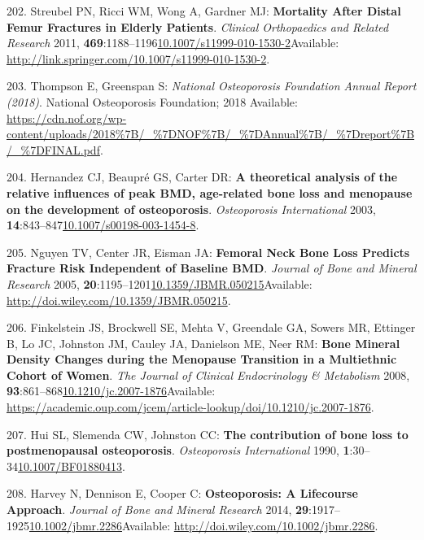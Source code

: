 \documentclass[
]{book}
\begin{document}
\leavevmode\hypertarget{ref-Streubel2011}{}%
202. Streubel PN, Ricci WM, Wong A, Gardner MJ: \textbf{Mortality After Distal Femur Fractures in Elderly Patients}. \emph{Clinical Orthopaedics and Related Research} 2011, \textbf{469}:1188--1196\href{https://doi.org/10.1007/s11999-010-1530-2}{10.1007/s11999-010-1530-2}Available: \url{http://link.springer.com/10.1007/s11999-010-1530-2}.

\leavevmode\hypertarget{ref-Thompson2018}{}%
203. Thompson E, Greenspan S: \emph{National Osteoporosis Foundation Annual Report (2018)}. National Osteoporosis Foundation; 2018 Available: \url{https://cdn.nof.org/wp-content/uploads/2018\%7B/_\%7DNOF\%7B/_\%7DAnnual\%7B/_\%7Dreport\%7B/_\%7DFINAL.pdf}.

\leavevmode\hypertarget{ref-Hernandez2003}{}%
204. Hernandez CJ, Beaupré GS, Carter DR: \textbf{A theoretical analysis of the relative influences of peak BMD, age-related bone loss and menopause on the development of osteoporosis}. \emph{Osteoporosis International} 2003, \textbf{14}:843--847\href{https://doi.org/10.1007/s00198-003-1454-8}{10.1007/s00198-003-1454-8}.

\leavevmode\hypertarget{ref-Nguyen2005}{}%
205. Nguyen TV, Center JR, Eisman JA: \textbf{Femoral Neck Bone Loss Predicts Fracture Risk Independent of Baseline BMD}. \emph{Journal of Bone and Mineral Research} 2005, \textbf{20}:1195--1201\href{https://doi.org/10.1359/JBMR.050215}{10.1359/JBMR.050215}Available: \url{http://doi.wiley.com/10.1359/JBMR.050215}.

\leavevmode\hypertarget{ref-Finkelstein2008}{}%
206. Finkelstein JS, Brockwell SE, Mehta V, Greendale GA, Sowers MR, Ettinger B, Lo JC, Johnston JM, Cauley JA, Danielson ME, Neer RM: \textbf{Bone Mineral Density Changes during the Menopause Transition in a Multiethnic Cohort of Women}. \emph{The Journal of Clinical Endocrinology \& Metabolism} 2008, \textbf{93}:861--868\href{https://doi.org/10.1210/jc.2007-1876}{10.1210/jc.2007-1876}Available: \url{https://academic.oup.com/jcem/article-lookup/doi/10.1210/jc.2007-1876}.

\leavevmode\hypertarget{ref-Hui1990}{}%
207. Hui SL, Slemenda CW, Johnston CC: \textbf{The contribution of bone loss to postmenopausal osteoporosis}. \emph{Osteoporosis International} 1990, \textbf{1}:30--34\href{https://doi.org/10.1007/BF01880413}{10.1007/BF01880413}.

\leavevmode\hypertarget{ref-Harvey2014b}{}%
208. Harvey N, Dennison E, Cooper C: \textbf{Osteoporosis: A Lifecourse Approach}. \emph{Journal of Bone and Mineral Research} 2014, \textbf{29}:1917--1925\href{https://doi.org/10.1002/jbmr.2286}{10.1002/jbmr.2286}Available: \url{http://doi.wiley.com/10.1002/jbmr.2286}.
\end{document}
